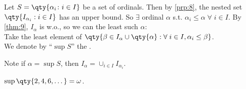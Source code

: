 \begin{remark}
    Let $S = \qty{\alpha_i \colon i \in I}$ be a set of ordinals.
    Then by \cref{prp:8}, the nested set $\qty{I_{\alpha_i} : i \in I}$ has an upper bound.
    So $\exists$ ordinal $\alpha$ s.t. $\alpha_i \leq \alpha \; \forall \; i \in I$.
    By \cref{thm:9}, $I_\alpha$ is w.o., so we can the least such $\alpha$: \\
    Take the least element of $\qty{\beta \in I_\alpha \cup \qty{\alpha} : \forall \; i \in I, \alpha_i \leq \beta}$. \\
    We denote by ``$\sup S$'' the .

    Note if $\alpha = \sup S$, then $I_\alpha = \cup_{i \in I} I_{\alpha_i}$.
\end{remark}

\begin{example}
    $\sup \qty{2, 4, 6, \dots} = \omega$.
\end{example}


